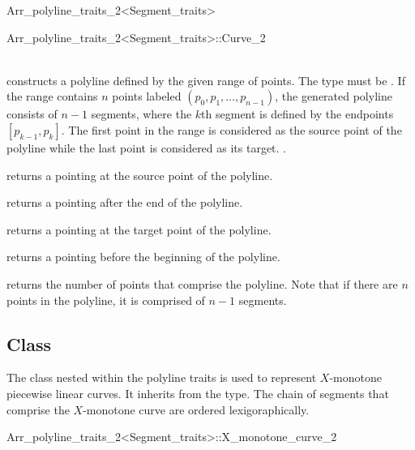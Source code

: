 \begin{ccRefClass}{Arr_polyline_traits_2<Segment_traits>}
\begin{ccClass}{Arr_polyline_traits_2<Segment_traits>::Curve_2}
  \ccCreation

   \\
  {constructs a polyline defined by the given range of points.
   The  type must be .
   If the range contains $n$ points labeled $(p_{0},p_{1},\ldots,p_{n-1})$,
   the generated polyline consists of $n-1$ segments, where the $k$th segment 
   is defined by the endpoints $[p_{k-1},p_{k}]$. The first point in the 
   range is considered as the source point of the polyline while the last 
   point is considered as its target.
   .}

\ccOperations

  {returns a  pointing at the source point of the 
   polyline.}

  {returns a  pointing after the end of the polyline.}

  {returns a  pointing at the target point of the 
   polyline.}

  {returns a  pointing before the beginning of the 
   polyline.}

  {returns the number of points that comprise the polyline. Note that if there
   are $n$ points in the polyline, it is comprised of $n-1$ segments.}

\end{ccClass}

\subsection*{Class }

The  class nested within the polyline traits is used
to represent $X$-monotone piecewise linear curves. It inherits from the
 type. The chain of segments that comprise the $X$-monotone
curve are ordered lexigoraphically.

\begin{ccClass}{Arr_polyline_traits_2<Segment_traits>::X_monotone_curve_2}
\end{ccClass}

\end{ccRefClass}
\ccRefPageEnd

